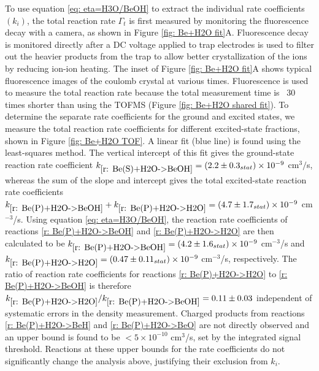 To use equation \ref{eq: eta=H3O/BeOH} to extract the individual rate coefficients $(k_i)$, the total reaction rate $\Gamma_t$ is first measured by monitoring the  fluorescence decay with a camera, as shown in Figure \ref{fig: Be+H2O fit}A. Fluorescence decay is monitored directly after a DC voltage applied to trap electrodes is used to filter out the heavier products from the trap to allow better crystallization of the  ions by reducing ion-ion heating.\cite{Chen2013} The inset of Figure \ref{fig: Be+H2O fit}A shows typical fluorescence images of the  coulomb crystal at various times. Fluorescence is used to measure the total reaction rate because the total measurement time is ~30 times shorter than using the TOFMS (Figure \ref{fig: Be+H2O shared fit}). To determine the separate rate coefficients for the  ground and excited states, we measure the total reaction rate coefficients for different excited-state fractions, shown in Figure \ref{fig: Be+H2O TOF}. A linear fit (blue line) is found using the least-squares method. The vertical intercept of this fit gives the  ground-state reaction rate coefficient $k_{\ref{r: Be(S)+H2O->BeOH}}=(2.2 \pm 0.3_{stat}) \times 10^{-9}$ cm$^3/$s, whereas the sum of the slope and intercept gives the total excited-state  reaction rate coefficients $k_{\ref{r: Be(P)+H2O->BeOH}} + k_{\ref{r: Be(P)+H2O->H2O}} = (4.7 \pm 1.7_{stat}) \times 10^{-9}$ cm$^{-3}$/s. Using equation \ref{eq: eta=H3O/BeOH}, the reaction rate coefficients of reactions \ref{r: Be(P)+H2O->BeOH} and \ref{r: Be(P)+H2O->H2O} are then calculated to be $k_{\ref{r: Be(P)+H2O->BeOH}} = (4.2 \pm 1.6_{stat}) \times 10^{-9}$ cm$^{-3}$/s and $k_{\ref{r: Be(P)+H2O->H2O}} = (0.47 \pm 0.11_{stat}) \times 10^{-9}$ cm$^{-3}$/s, respectively. The ratio of reaction rate coefficients for reactions \ref{r: Be(P)+H2O->H2O} to \ref{r: Be(P)+H2O->BeOH} is therefore $k_{\ref{r: Be(P)+H2O->H2O}}/k_{\ref{r: Be(P)+H2O->BeOH}} = 0.11 \pm 0.03$ independent of systematic errors in the density measurement. Charged products from reactions \ref{r: Be(P)+H2O->BeH} and \ref{r: Be(P)+H2O->BeO} are not directly observed and an upper bound is found to be $<5\times10^{-10}$ cm$^3$/s, set by the integrated signal threshold. Reactions at these upper bounds for the rate coefficients do not significantly change the analysis above, justifying their exclusion from $k_i$.

